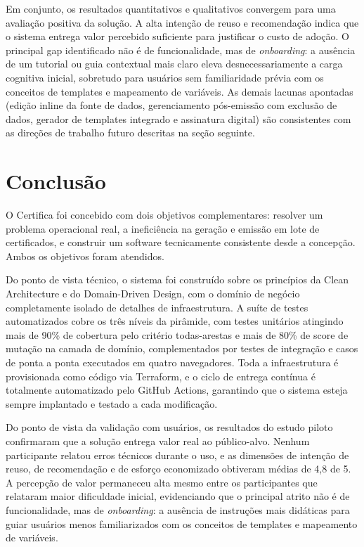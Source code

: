 \documentclass[article,a4paper,12pt,brazil,sumario=tradicional]{abntex2}
\begin{document}
Em conjunto, os resultados quantitativos e qualitativos convergem para uma avaliação positiva da solução. A alta intenção de reuso e recomendação indica que o sistema entrega valor percebido suficiente para justificar o custo de adoção. O principal gap identificado não é de funcionalidade, mas de \textit{onboarding}: a ausência de um tutorial ou guia contextual mais claro eleva desnecessariamente a carga cognitiva inicial, sobretudo para usuários sem familiaridade prévia com os conceitos de templates e mapeamento de variáveis. As demais lacunas apontadas (edição inline da fonte de dados, gerenciamento pós-emissão com exclusão de dados, gerador de templates integrado e assinatura digital) são consistentes com as direções de trabalho futuro descritas na seção seguinte.

\section{Conclusão}\label{sec:conclusao}

O Certifica foi concebido com dois objetivos complementares: resolver um problema operacional real, a ineficiência na geração e emissão em lote de certificados, e construir um software tecnicamente consistente desde a concepção. Ambos os objetivos foram atendidos.

Do ponto de vista técnico, o sistema foi construído sobre os princípios da Clean Architecture e do Domain-Driven Design, com o domínio de negócio completamente isolado de detalhes de infraestrutura. A suíte de testes automatizados cobre os três níveis da pirâmide, com testes unitários atingindo mais de 90\% de cobertura pelo critério todas-arestas e mais de 80\% de score de mutação na camada de domínio, complementados por testes de integração e casos de ponta a ponta executados em quatro navegadores. Toda a infraestrutura é provisionada como código via Terraform, e o ciclo de entrega contínua é totalmente automatizado pelo GitHub Actions, garantindo que o sistema esteja sempre implantado e testado a cada modificação.

Do ponto de vista da validação com usuários, os resultados do estudo piloto confirmaram que a solução entrega valor real ao público-alvo. Nenhum participante relatou erros técnicos durante o uso, e as dimensões de intenção de reuso, de recomendação e de esforço economizado obtiveram médias de 4,8 de 5. A percepção de valor permaneceu alta mesmo entre os participantes que relataram maior dificuldade inicial, evidenciando que o principal atrito não é de funcionalidade, mas de \textit{onboarding}: a ausência de instruções mais didáticas para guiar usuários menos familiarizados com os conceitos de templates e mapeamento de variáveis.
\end{document}
